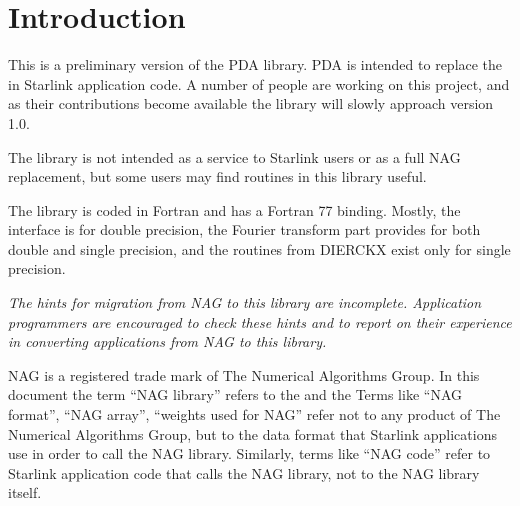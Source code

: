  \newpage
 \begin{latexonly}
   \setlength{\parskip}{0mm}
   \latexonlytoc
   \setlength{\parskip}{\medskipamount}
   \markboth{\stardocname}{\stardocname}
 \end{latexonly}
\cleardoublepage
\renewcommand{\thepage}{\arabic{page}}
\setcounter{page}{1}

\section{Introduction}

   This is a preliminary version of the PDA library. PDA
   is intended to replace the
   in Starlink application code. A number of people are working on this
   project, and as their contributions become available the
   library will slowly approach version 1.0.

   The library is not intended as a service to Starlink users or as a
   full NAG replacement, but some users may find routines in this library
   useful.

   The library is coded in Fortran and has a Fortran 77 binding. Mostly,
   the interface is for double precision, the Fourier transform part
   provides for both double and single precision, and the routines from
   DIERCKX exist only for single precision.

{\em 
   The hints for migration from NAG to this library are incomplete.
   Application programmers are encouraged to check these hints and to
   report on their experience in converting applications from NAG to
   this library.

   NAG is a registered trade mark of The Numerical Algorithms Group. In
   this document the term ``NAG library'' refers to the
   and the
   Terms like ``NAG format'', ``NAG array'', ``weights used for NAG''
   refer not to any product of The Numerical Algorithms Group, but to
   the data format that Starlink applications use in order to call the
   NAG library. Similarly, terms like ``NAG code'' refer to Starlink
   application code that calls the NAG library, not to the NAG library
   itself.
\/}

